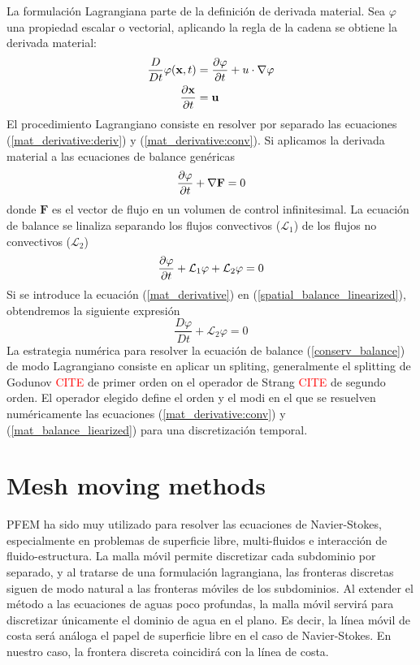 La formulación Lagrangiana parte de la definición de derivada material. Sea $\varphi$ una propiedad escalar o vectorial, aplicando la regla de la cadena se obtiene la derivada material:
\begin{subequations} \label{mat_derivative}
\begin{align}
\frac{D}{Dt}\varphi(\mathbf{x},t) &= \frac{\partial\varphi}{\partial t} + u\cdot\nabla\varphi \label{mat_derivative:deriv} \\
\frac{\partial\mathbf{x}}{\partial t} &= \mathbf{u} \label{mat_derivative:conv}
\end{align}
\end{subequations}
El procedimiento Lagrangiano consiste en resolver por separado las ecuaciones (\ref{mat_derivative:deriv}) y (\ref{mat_derivative:conv}). Si aplicamos la derivada material a las ecuaciones de balance genéricas
\begin{equation} \label{conserv_balance}
\frac{\partial\varphi}{\partial t} + \nabla \mathbf{F} = 0
\end{equation}
donde $\mathbf{F}$ es el vector de flujo en un volumen de control infinitesimal. La ecuación de balance se linaliza separando los flujos convectivos ($\mathcal{L}_1$) de los flujos no convectivos ($\mathcal{L}_2$)
\begin{equation} \label{spatial_balance_linearized}
    \frac{\partial\varphi}{\partial t} + \mathcal{L}_1 \varphi + \mathcal{L}_2 \varphi = 0
\end{equation}
Si se introduce la ecuación (\ref{mat_derivative}) en (\ref{spatial_balance_linearized}), obtendremos la siguiente expresión
\begin{equation} \label{mat_balance_liearized}
    \frac{D\varphi}{Dt} + \mathcal{L}_2 \varphi = 0
\end{equation}
La estrategia numérica para resolver la ecuación de balance (\ref{conserv_balance}) de modo Lagrangiano consiste en aplicar un spliting, generalmente el splitting de Godunov \textcolor{red}{CITE} de primer orden on el operador de Strang \textcolor{red}{CITE} de segundo orden. El operador elegido define el orden y el modi en el que se resuelven numéricamente las ecuaciones (\ref{mat_derivative:conv}) y (\ref{mat_balance_liearized}) para una discretización temporal.



\section{Mesh moving methods}


PFEM ha sido muy utilizado para resolver las ecuaciones de Navier-Stokes, especialmente en problemas de superficie libre, multi-fluidos e interacción de fluido-estructura. La malla móvil permite discretizar cada subdominio por separado, y al tratarse de una formulación lagrangiana, las fronteras discretas siguen de modo natural a las fronteras móviles de los subdominios. Al extender el método a las ecuaciones de aguas poco profundas, la malla móvil servirá para discretizar únicamente el dominio de agua en el plano. Es decir, la línea móvil de costa será análoga el papel de superficie libre en el caso de Navier-Stokes. En nuestro caso, la frontera discreta coincidirá con la línea de costa.


